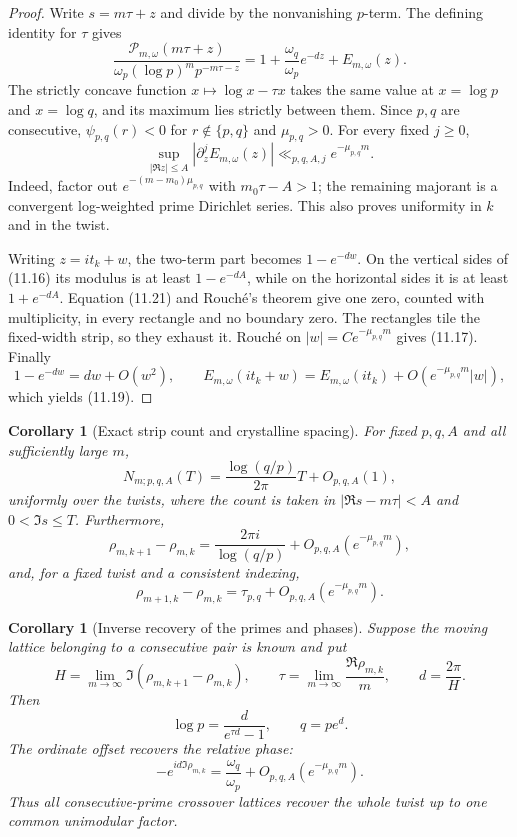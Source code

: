 \documentclass[11pt]{article}
\newtheorem{corollary}[theorem]{Corollary}
\theoremstyle{definition}
\theoremstyle{remark}
\newcommand{\cP}{\mathcal P}
\begin{document}
\begin{proof}
Write $s=m\tau+z$ and divide by the nonvanishing $p$-term.  The defining
identity for $\tau$ gives
\[
 \frac{\cP_{m,\omega}(m\tau+z)}
 {\omega_p(\log p)^mp^{-m\tau-z}}
 =1+\frac{\omega_q}{\omega_p}e^{-dz}+E_{m,\omega}(z).
\tag{11.20}
\]
The strictly concave function $x\mapsto\log x-\tau x$ takes the same value at
$x=\log p$ and $x=\log q$, and its maximum lies strictly between them.  Since
$p,q$ are consecutive, $\psi_{p,q}(r)<0$ for $r\notin\{p,q\}$ and
$\mu_{p,q}>0$.  For every fixed $j\ge0$,
\[
 \sup_{|\Re z|\le A}|\partial_z^jE_{m,\omega}(z)|
 \ll_{p,q,A,j}e^{-\mu_{p,q}m}.
\tag{11.21}
\]
Indeed, factor out $e^{-(m-m_0)\mu_{p,q}}$ with
$m_0\tau-A>1$; the remaining majorant is a convergent log-weighted prime
Dirichlet series.  This also proves uniformity in $k$ and in the twist.

Writing $z=it_k+w$, the two-term part becomes $1-e^{-dw}$.  On the vertical
sides of (11.16) its modulus is at least $1-e^{-dA}$, while on the horizontal
sides it is at least $1+e^{-dA}$.  Equation (11.21) and Rouch\'e's theorem give
one zero, counted with multiplicity, in every rectangle and no boundary zero.
The rectangles tile the fixed-width strip, so they exhaust it.  Rouch\'e on
$|w|=Ce^{-\mu_{p,q}m}$ gives (11.17).  Finally
\[
 1-e^{-dw}=dw+O(w^2),\qquad
 E_{m,\omega}(it_k+w)=E_{m,\omega}(it_k)
 +O(e^{-\mu_{p,q}m}|w|),
\]
which yields (11.19).
\end{proof}

\begin{corollary}[Exact strip count and crystalline spacing]
\label{cor:crystalline-count}
For fixed $p,q,A$ and all sufficiently large $m$,
\[
 \boxed{
 N_{m;p,q,A}(T)=\frac{\log(q/p)}{2\pi}T+O_{p,q,A}(1),}
\tag{11.22}
\]
uniformly over the twists, where the count is taken in
$|\Re s-m\tau|<A$ and $0<\Im s\le T$.  Furthermore,
\[
 \rho_{m,k+1}-\rho_{m,k}
 =\frac{2\pi i}{\log(q/p)}+O_{p,q,A}(e^{-\mu_{p,q}m}),
\tag{11.23}
\]
and, for a fixed twist and a consistent indexing,
\[
 \rho_{m+1,k}-\rho_{m,k}
 =\tau_{p,q}+O_{p,q,A}(e^{-\mu_{p,q}m}).
\tag{11.24}
\]
\end{corollary}

\begin{corollary}[Inverse recovery of the primes and phases]
\label{cor:lattice-inversion}
Suppose the moving lattice belonging to a consecutive pair is known and put
\[
 H=\lim_{m\to\infty}\Im(\rho_{m,k+1}-\rho_{m,k}),\qquad
 \tau=\lim_{m\to\infty}\frac{\Re\rho_{m,k}}m,\qquad d=\frac{2\pi}{H}.
\]
Then
\[
 \boxed{
 \log p=\frac{d}{e^{\tau d}-1},\qquad q=pe^d.}
\tag{11.25}
\]
The ordinate offset recovers the relative phase:
\[
 \boxed{
 -e^{id\Im\rho_{m,k}}=\frac{\omega_q}{\omega_p}
 +O_{p,q,A}(e^{-\mu_{p,q}m}).}
\tag{11.26}
\]
Thus all consecutive-prime crossover lattices recover the whole twist up to one
common unimodular factor.
\end{corollary}
\end{document}
